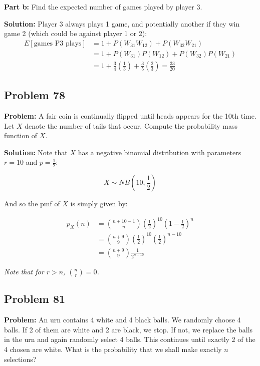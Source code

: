 \documentclass{article}
\begin{document}
\noindent\textbf{Part b:} Find the expected number of games played by player 3.
\bigskip

\noindent\textbf{Solution:} Player 3 always plays 1 game, and potentially another if they win game 2 (which could be against player 1 or 2):
\begin{align*}
    E[\text{games P3 plays}]&=1+P(W_{31}W_{12})+P(W_{32}W_{21})\\
    &=1+P(W_{31})P(W_{12})+P(W_{32})P(W_{21})\tag{independence}\\
    &=1+\frac{3}{4}\left(\frac{1}{3}\right)+\frac{3}{5}\left(\frac{2}{3}\right)=\frac{33}{20}
\end{align*}
\pagebreak

\subsection*{Problem 78}
\noindent\textbf{Problem:} A fair coin is continually flipped until heads appears for the 10th time. Let $X$ denote the number of tails that occur. Compute the probability mass function of $X$.
\bigskip

\noindent\textbf{Solution:} Note that $X$ has a negative binomial distribution with parameters $r=10$ and $p=\frac{1}{2}$:

\begin{equation*}
    X\sim NB\left(10,\frac{1}{2}\right)
\end{equation*}

And so the pmf of $X$ is simply given by:

\begin{align*}
    p_X(n)&=\binom{n+10-1}{n}\left(\frac{1}{2}\right)^{10}\left(1-\frac{1}{2}\right)^{n}\\
    &=\binom{n+9}{9}\left(\frac{1}{2}\right)^{10}\left(\frac{1}{2}\right)^{n-10}\\
    &=\binom{n+9}{9}\frac{1}{2^{n+10}}
\end{align*}

\textit{Note that for $r>n$, $\binom{n}{r}=0$.}

\subsection*{Problem 81}
\noindent\textbf{Problem:} An urn contains 4 white and 4 black balls. We randomly choose 4 balls. If 2 of them are white and 2 are black, we stop. If not, we replace the balls in the urn and again randomly select 4 balls. This continues until exactly 2 of the 4 chosen are white. What is the probability that we shall make exactly $n$ selections?
\bigskip
\end{document}
